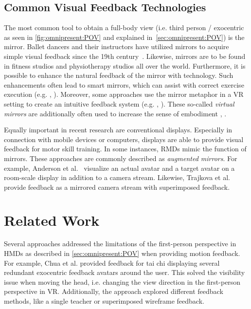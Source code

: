 \subsection{Common Visual Feedback Technologies} %
The most common tool to obtain a full-body view (i.e. third person / exocentric as seen in \autoref{fig:omnipresent:POV} and explained in~\autoref{sec:omnipresent:POV}) is the mirror. Ballet dancers and their instructors have utilized mirrors to acquire simple visual feedback since the 19th century~\cite{desmond1997mim}. Likewise, mirrors are to be found in fitness studios and physiotherapy studios all over the world. Furthermore, it is possible to enhance the natural feedback of the mirror with technology. Such enhancements often lead to smart mirrors, which can assist with correct exercise execution (e.g. \cite{kim2020rtm}, \cite{park2021ued}). Moreover, some approaches use the mirror metaphor in a VR setting to create an intuitive feedback system (e.g. \cite{waltemate2016tlp}, \cite{huelsmann2019ssp}). These so-called \emph{virtual mirrors} are additionally often used to increase the sense of embodiment \cite{inoue2021virtual}, \cite{gonzalesfranco2010contribution}.

Equally important in recent research are conventional displays. Especially in connection with mobile devices or computers, displays are able to provide visual feedback for motor skill training. In some instances, RMDs mimic the function of mirrors. These approaches are commonly described as \emph{augmented mirrors}. For example, Anderson et al.~\cite{anderson2013youmove} visualize an actual avatar and a target avatar on a room-scale display in addition to a camera stream. Likewise, Trajkova et al.~\cite{trajkova2018ttb} provide feedback as a mirrored camera stream with superimposed feedback.

\section{Related Work}
Several approaches addressed the limitations of the first-person perspective in HMDs as described in \autoref{sec:omnipresent:POV} when providing motion feedback. For example, Chua et al.\cite{chua2003tpt} provided feedback for tai chi displaying several redundant exocentric feedback avatars around the user. This solved the visibility issue when moving the head, i.e. changing the view direction in the first-person perspective in VR. Additionally, the approach explored different feedback methods, like a single teacher or superimposed wireframe feedback.

